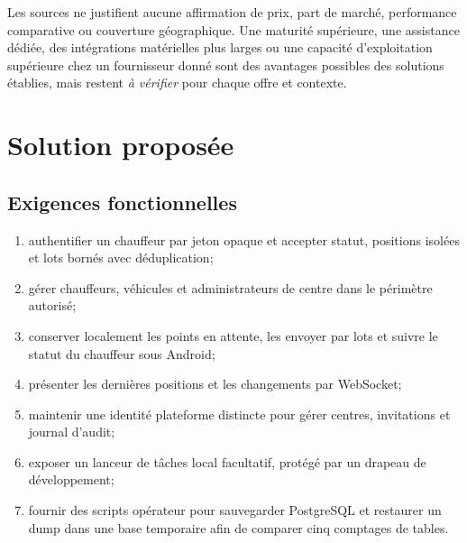 \documentclass[12pt,a4paper]{article}
\begin{document}
Les sources ne justifient aucune affirmation de prix, part de marché, performance comparative ou couverture géographique. Une maturité supérieure, une assistance dédiée, des intégrations matérielles plus larges ou une capacité d'exploitation supérieure chez un fournisseur donné sont des avantages possibles des solutions établies, mais restent \emph{à vérifier} pour chaque offre et contexte.

\section{Solution proposée}

\subsection{Exigences fonctionnelles}
\begin{enumerate}
\item authentifier un chauffeur par jeton opaque et accepter statut, positions isolées et lots bornés avec déduplication;
\item gérer chauffeurs, véhicules et administrateurs de centre dans le périmètre autorisé;
\item conserver localement les points en attente, les envoyer par lots et suivre le statut du chauffeur sous Android;
\item présenter les dernières positions et les changements par WebSocket;
\item maintenir une identité plateforme distincte pour gérer centres, invitations et journal d'audit;
\item exposer un lanceur de tâches local facultatif, protégé par un drapeau de développement;
\item fournir des scripts opérateur pour sauvegarder PostgreSQL et restaurer un dump dans une base temporaire afin de comparer cinq comptages de tables.
\end{enumerate}
\end{document}
